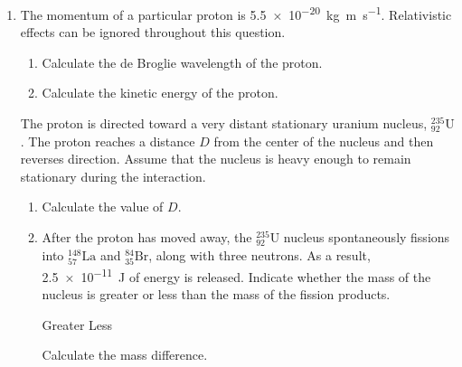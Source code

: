\documentclass{../../../oss-apphys}
\begin{document}
\begin{enumerate}[leftmargin=15pt]
\item The momentum of a particular proton is
  \SI{5.5e-20}{\kilo\gram\metre\per\second}. Relativistic effects can be
  ignored throughout this question.
  \begin{enumerate}[leftmargin=18pt]
  \item Calculate the de Broglie wavelength of the proton.
  \item Calculate the kinetic energy of the proton.
  \end{enumerate}
  The proton is directed toward a very distant stationary uranium nucleus,
  $^{235}_{92}\text{U}$. The proton reaches a distance $D$ from the center of the
  nucleus and then reverses direction. Assume that the nucleus is heavy enough
  to remain stationary during the interaction.
  \begin{enumerate}[leftmargin=18pt,resume]
  \item Calculate the value of $D$.
  \item After the proton has moved away, the $^{235}_{92}\text{U}$ nucleus
    spontaneously fissions into $^{148}_{57}\text{La}$ and $^{84}_{35}\text{Br}$,
    along  with three neutrons. As a result, \SI{2.5e-11}{\joule} of energy is
    released. Indicate whether the mass of the nucleus is greater or less than
    the mass of the fission products.

    \vspace{.1in}
    \underline{\hspace{.3in}} Greater\hspace{.2in}
    \underline{\hspace{.3in}} Less
    
    \vspace{.1in}Calculate the mass difference.
  \end{enumerate}
  

\end{enumerate}
\end{document}
